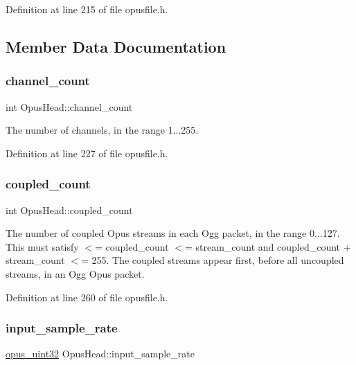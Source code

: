 Definition at line 215 of file opusfile.\+h.



\subsection{Member Data Documentation}
\mbox{\label{struct_opus_head_ae3b3fc1a70e6b037c1d1d416fbdf2c8d}} 
\subsubsection{\texorpdfstring{channel\_count}{channel\_count}}
{\footnotesize\ttfamily int Opus\+Head\+::channel\+\_\+count}

The number of channels, in the range 1...255. 

Definition at line 227 of file opusfile.\+h.

\mbox{\label{struct_opus_head_a0b3e512ec24c989b0374358446197782}} 
\subsubsection{\texorpdfstring{coupled\_count}{coupled\_count}}
{\footnotesize\ttfamily int Opus\+Head\+::coupled\+\_\+count}

The number of coupled Opus streams in each Ogg packet, in the range 0...127. This must satisfy { $<$= coupled\+\_\+count $<$= stream\+\_\+count} and {\ttfamily coupled\+\_\+count + stream\+\_\+count $<$= 255}. The coupled streams appear first, before all uncoupled streams, in an Ogg Opus packet. 

Definition at line 260 of file opusfile.\+h.

\mbox{\label{struct_opus_head_a73b80a913eca33d829f1667caee80d9e}} 
\subsubsection{\texorpdfstring{input\_sample\_rate}{input\_sample\_rate}}
{\footnotesize\ttfamily \mbox{\hyperlink{opus__types_8h_a643eaaadb9ef6cd44308e0299d8cd8ce}{opus\+\_\+uint32}} Opus\+Head\+::input\+\_\+sample\+\_\+rate}

